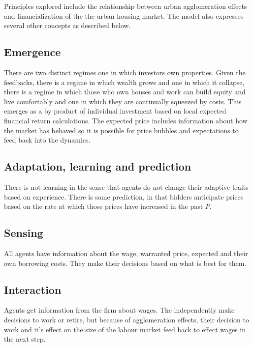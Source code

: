 Principles explored include the relationship between urban agglomeration effects and financialization of the the urban housing market. The model also expresses several other concepts as described below.

\subsection{Emergence}
There are two distinct regimes one in which investors own properties. Given the feedbacks, there is a regime in which wealth grows and one in which it collapse, there is a regime in which those who own houses and work can build equity and live comfortably and one in which they are continually squeezed by costs. This emerges as a by product of individual investment based on local expected financial return calculations. 
The expected price includes information about how the market has behaved so it is possible for price bubbles and expectations to feed back into the dynamics. 

\subsection{Adaptation, learning and prediction}



There is not learning in the sense that agents do not change their adaptive traits based on experience. 
There is some prediction, in that bidders anticipate prices based on the rate at which those prices have increased in the past $\dot P$.

\subsection{Sensing}
All agents have information about the wage, warranted price, expected and their own borrowing costs. They make their decisions based on what is best for them. 

\subsection{Interaction}
Agents get information from the firm about wages. The independently make decisions to work or retire, but because of agglomeration effects, their decision to work and it's effect on the size of the labour market feed back to effect wages in the next step. 

